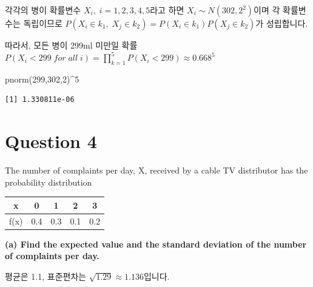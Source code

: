 \documentclass[
  letterpaper,
  DIV=11,
  numbers=noendperiod]{scrreprt}
\newenvironment{Shaded}{\begin{snugshade}}{\end{snugshade}}
\newcommand{\AttributeTok}[1]{\textcolor[rgb]{0.40,0.45,0.13}{#1}}
\newcommand{\DecValTok}[1]{\textcolor[rgb]{0.68,0.00,0.00}{#1}}
\newcommand{\FloatTok}[1]{\textcolor[rgb]{0.68,0.00,0.00}{#1}}
\newcommand{\FunctionTok}[1]{\textcolor[rgb]{0.28,0.35,0.67}{#1}}
\newcommand{\NormalTok}[1]{\textcolor[rgb]{0.00,0.23,0.31}{#1}}
\newcommand{\OtherTok}[1]{\textcolor[rgb]{0.00,0.23,0.31}{#1}}
\newcommand{\SpecialCharTok}[1]{\textcolor[rgb]{0.37,0.37,0.37}{#1}}
\newcommand{\StringTok}[1]{\textcolor[rgb]{0.13,0.47,0.30}{#1}}
\begin{document}
각각의 병이 확률변수 \(X_i,\;i=1,2,3,4,5\)라고 하면
\(X_i\sim N(302,2^2)\)이며 각 확률변수는 독립이므로
\(P(X_i\in k_1,\;X_j\in k_2)=P(X_i\in k_1)P(X_j\in k_2)\)가 성립합니다.

따라서, 모든 병이 299ml 미만일 확률
\(P(X_i<299\;for\;all\;i)=\prod_{k=1}^5 P(X_i<299)\approx 0.668^5\)

\begin{Shaded}
\begin{Highlighting}[]
\FunctionTok{pnorm}\NormalTok{(}\DecValTok{299}\NormalTok{,}\DecValTok{302}\NormalTok{,}\DecValTok{2}\NormalTok{)}\SpecialCharTok{\^{}}\DecValTok{5}
\end{Highlighting}
\end{Shaded}

\begin{verbatim}
[1] 1.330811e-06
\end{verbatim}

\section*{Question 4}\label{question-4-1}


The number of complaints per day, X, received by a cable TV distributor
has the probability distribution

\begin{longtable}[]{@{}ccccc@{}}
\toprule\noalign{}
x & 0 & 1 & 2 & 3 \\
\midrule\noalign{}
\endhead
\bottomrule\noalign{}
\endlastfoot
f(x) & 0.4 & 0.3 & 0.1 & 0.2 \\
\end{longtable}

\textbf{(a) Find the expected value and the standard deviation of the
number of complaints per day.}

평균은 1.1, 표준편차는 \(\sqrt{1.29}\approx 1.136\)입니다.

\begin{Shaded}
\end{Shaded}
\end{document}
